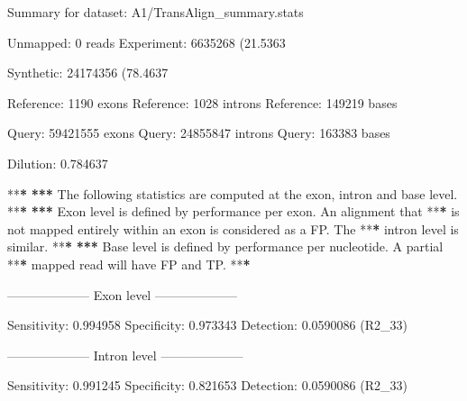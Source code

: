 \documentclass[]{article}
\newenvironment{Shaded}{\begin{snugshade}}{\end{snugshade}}
\newcommand{\DecValTok}[1]{\textcolor[rgb]{0.00,0.00,0.81}{{#1}}}
\newcommand{\FloatTok}[1]{\textcolor[rgb]{0.00,0.00,0.81}{{#1}}}
\newcommand{\StringTok}[1]{\textcolor[rgb]{0.31,0.60,0.02}{{#1}}}
\newcommand{\ErrorTok}[1]{\textbf{{#1}}}
\newcommand{\NormalTok}[1]{{#1}}
\begin{document}
\begin{Shaded}
\begin{Highlighting}[]
\NormalTok{Summary for dataset:}\StringTok{ }\NormalTok{A1/TransAlign_summary.stats}

   \NormalTok{Unmapped:}\StringTok{   }\DecValTok{0} \NormalTok{reads}
   \NormalTok{Experiment:}\StringTok{ }\DecValTok{6635268} \NormalTok{(}\FloatTok{21.5363}\NormalTok{%
   \NormalTok{Synthetic:}\StringTok{  }\DecValTok{24174356} \NormalTok{(}\FloatTok{78.4637}\NormalTok{%

   \NormalTok{Reference:}\StringTok{  }\DecValTok{1190} \NormalTok{exons}
   \NormalTok{Reference:}\StringTok{  }\DecValTok{1028} \NormalTok{introns}
   \NormalTok{Reference:}\StringTok{  }\DecValTok{149219} \NormalTok{bases}

   \NormalTok{Query:}\StringTok{      }\DecValTok{59421555} \NormalTok{exons}
   \NormalTok{Query:}\StringTok{      }\DecValTok{24855847} \NormalTok{introns}
   \NormalTok{Query:}\StringTok{      }\DecValTok{163383} \NormalTok{bases}

   \NormalTok{Dilution:}\StringTok{   }\FloatTok{0.784637}

   \NormalTok{**}\ErrorTok{*}
\StringTok{   }\ErrorTok{***}\StringTok{ }\NormalTok{The following statistics are computed at the exon, intron and base level.}
   \NormalTok{**}\ErrorTok{*}
\StringTok{   }\ErrorTok{***}\StringTok{ }\NormalTok{Exon level is defined by performance per exon. An alignment that}
   \NormalTok{**}\ErrorTok{*}\StringTok{ }\NormalTok{is not mapped entirely within an exon is considered as a FP. The}
   \NormalTok{**}\ErrorTok{*}\StringTok{ }\NormalTok{intron level is similar.}
   \NormalTok{**}\ErrorTok{*}
\StringTok{   }\ErrorTok{***}\StringTok{ }\NormalTok{Base level is defined by performance per nucleotide. A partial}
   \NormalTok{**}\ErrorTok{*}\StringTok{ }\NormalTok{mapped read will have FP and TP.}
   \NormalTok{**}\ErrorTok{*}

\StringTok{   }\NormalTok{--------------------}\StringTok{ }\NormalTok{Exon level --------------------}

\StringTok{   }\NormalTok{Sensitivity:}\StringTok{ }\FloatTok{0.994958}
   \NormalTok{Specificity:}\StringTok{ }\FloatTok{0.973343}
   \NormalTok{Detection:}\StringTok{   }\FloatTok{0.0590086} \NormalTok{(R2_33)}

   \NormalTok{--------------------}\StringTok{ }\NormalTok{Intron level --------------------}

\StringTok{   }\NormalTok{Sensitivity:}\StringTok{ }\FloatTok{0.991245}
   \NormalTok{Specificity:}\StringTok{ }\FloatTok{0.821653}
   \NormalTok{Detection:}\StringTok{   }\FloatTok{0.0590086} \NormalTok{(R2_33)}

}}
\end{Highlighting}
\end{Shaded}
\end{document}
